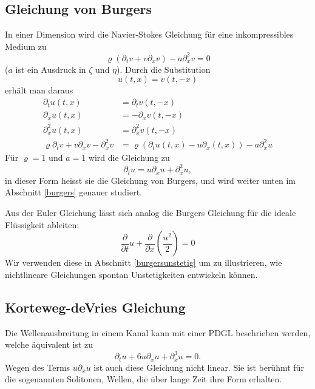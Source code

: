 \subsection{Gleichung von Burgers}
In einer Dimension  wird die Navier-Stokes Gleichung für eine inkompressibles
Medium zu
\[
\varrho(\partial_t v+v\partial_x v)-a\partial_x^2v=0
\]
($a$ ist ein Ausdruck in $\zeta$ und $\eta$).
Durch die Substitution
\[
u(t,x)=v(t,-x)
\]
erhält man daraus 
\begin{align*}
\partial_tu(t,x)&=\partial_tv(t,-x)\\
\partial_xu(t,x)&=-\partial_xv(t,-x)\\
\partial_x^2u(t,x)&=\partial_x^2v(t,-x)\\
\varrho
\partial_t v+v\partial_x v-\partial_x^2v
&=
\varrho(\partial_tu(t,x)-u\partial_x(t,x))-a\partial_x^2u
\end{align*}
Für $\varrho=1$ und $a=1$ wird die Gleichung zu
\[
\partial_tu=u\partial_xu+\partial_x^2u,
\]
in dieser Form heisst sie die Gleichung von Burgers,
und wird weiter unten im Abschnitt
\ref{burgers} genauer studiert.

Aus der Euler Gleichung lässt sich analog die Burgers Gleichung
für die ideale Flüssigkeit ableiten:
\[
\frac{\partial}{\partial t}u+\frac{\partial}{\partial x}\left(\frac{u^2}2\right)
=0
\]
Wir verwenden diese in Abschnitt \ref{burgersunstetig} um zu illustrieren,
wie nichtlineare Gleichungen spontan Unstetigkeiten entwickeln können.

\subsection{Korteweg-deVries Gleichung}
Die Wellenausbreitung in einem Kanal kann mit einer PDGL beschrieben werden,
welche äquivalent ist zu
\[
\partial_tu+6u\partial_xu+\partial_x^3u=0.
\]
Wegen des Terms $u\partial_xu$ ist auch diese Gleichung nicht linear.
Sie ist berühmt für die sogenannten Solitonen, Wellen, die über
lange Zeit ihre Form erhalten.

